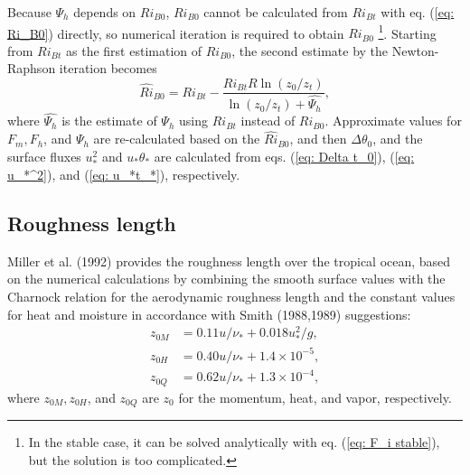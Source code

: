 Because $\Psi_h$ depends on $Ri_{B0}$,
$Ri_{B0}$ cannot be calculated from $Ri_{Bt}$ with eq. (\ref{eq: Ri_B0})
directly,
so numerical iteration is required to obtain $Ri_{B0}$
\footnote{In the stable case, it can be solved analytically
with eq. (\ref{eq: F_i stable}),
but the solution is too complicated.}.
Starting from $Ri_{Bt}$ as the first estimation of $Ri_{B0}$,
the second estimate by the Newton-Raphson iteration becomes
\begin{equation}
  \hat{Ri}_{B0} = Ri_{Bt} - \frac{Ri_{Bt}R\ln(z_0/z_t)}{\ln(z_0/z_t) + \hat{\Psi_h}},
\end{equation}
where $\hat{\Psi_h}$ is the estimate of $\Psi_h$ using $Ri_{Bt}$ instead of $Ri_{B0}$.
Approximate values for $F_m, F_h$, and $\Psi_h$ are re-calculated
based on the $\hat{Ri}_{B0}$,
and then
$\Delta\theta_0$, and the surface fluxes $u_*^2$ and $u_*\theta_*$
are calculated from eqs. (\ref{eq: Delta t_0}), (\ref{eq: u_*^2}),
and (\ref{eq: u_*t_*}), respectively.


\subsection{Roughness length}
Miller et al. (1992) provides the roughness length over the tropical ocean,
based on the numerical calculations
by combining the smooth surface values with the Charnock relation
for the aerodynamic roughness length
and the constant values for heat and moisture in accordance with Smith (1988,1989) suggestions:
\begin{align}
  z_{0M} &= 0.11u/\nu_* + 0.018u_*^2/g, \\
  z_{0H} &= 0.40u/\nu_* + 1.4 \times 10^{-5}, \\
  z_{0Q} &= 0.62u/\nu_* + 1.3 \times 10^{-4},
\end{align}
where $z_{0M}, z_{0H}$, and $z_{0Q}$ are $z_0$ for the momentum, heat, and vapor,
respectively.
